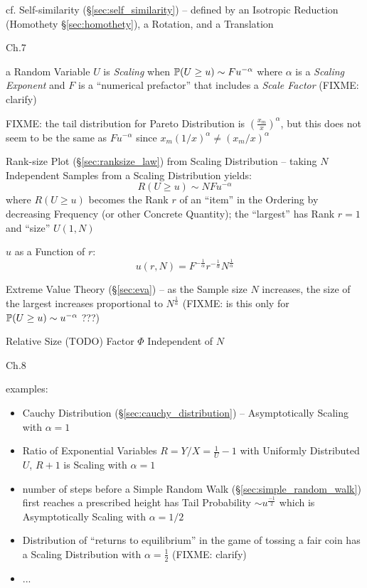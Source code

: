 cf. Self-similarity (\S\ref{sec:self_similarity}) -- defined by an Isotropic
Reduction (Homothety \S\ref{sec:homothety}), a Rotation, and a Translation

Ch.7

a Random Variable $U$ is \emph{Scaling} when $\mathbb{P}(U \geq u) \sim Fu^{-\alpha}$
where $\alpha$ is a \emph{Scaling Exponent} and $F$ is a ``numerical prefactor''
that includes a \emph{Scale Factor} (FIXME: clarify)

FIXME: the tail distribution for Pareto Distribution is
$(\frac{x_m}{x})^\alpha$, but this does not seem to be the same as
$Fu^{-\alpha}$ since $x_m (1/x)^\alpha \neq (x_m/x)^\alpha$

Rank-size Plot (\S\ref{sec:ranksize_law}) from Scaling Distribution -- taking
$N$ Independent Samples from a Scaling Distribution yields:
\[
  R(U \geq u) \sim N F u^{-\alpha}
\]
where $R(U \geq u)$ becomes the Rank $r$ of an ``item'' in the Ordering by
decreasing Frequency (or other Concrete Quantity); the ``largest'' has Rank
$r=1$ and ``size'' $U(1, N)$

$u$ as a Function of $r$:
\[
  u(r, N) = F^{-\frac{1}{\alpha}} r^{-\frac{1}{\alpha}} N^\frac{1}{\alpha}
\]

Extreme Value Theory (\S\ref{sec:eva}) -- as the Sample size $N$ increases, the
size of the largest increases proportional to $N^{\frac{1}{\alpha}}$
(FIXME: is this only for $\mathbb{P}(U \geq u) \sim u^{-\alpha}$ ???)

Relative Size (TODO) Factor $\Phi$ Independent of $N$

Ch.8

examples:

\begin{itemize}
  \item Cauchy Distribution (\S\ref{sec:cauchy_distribution}) -- Asymptotically
    Scaling with $\alpha = 1$
  \item Ratio of Exponential Variables $R = Y/X = \frac{1}{U} - 1$ with
    Uniformly Distributed $U$, $R+1$ is Scaling with $\alpha = 1$
  \item number of steps before a Simple Random Walk
    (\S\ref{sec:simple_random_walk}) first reaches a prescribed height has Tail
    Probability $\sim u^\frac{-1}{2}$ which is Asymptotically Scaling with
    $\alpha = 1/2$
  \item Distribution of ``returns to equilibrium'' in the game of tossing a fair
    coin has a Scaling Distribution with $\alpha = \frac{1}{2}$ (FIXME: clarify)
  \item ...
\end{itemize}

